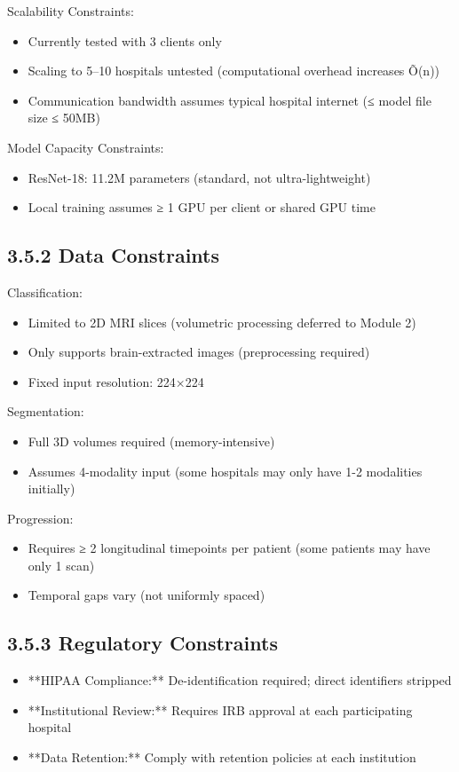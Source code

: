 Scalability Constraints:

\begin{itemize}
  \item Currently tested with 3 clients only
  \item Scaling to 5–10 hospitals untested (computational overhead increases \~O(n))
  \item Communication bandwidth assumes typical hospital internet (≤ model file size ≤ 50MB)
\end{itemize}

Model Capacity Constraints:

\begin{itemize}
  \item ResNet-18: 11.2M parameters (standard, not ultra-lightweight)
  \item Local training assumes ≥ 1 GPU per client or shared GPU time
\end{itemize}


\subsection{3.5.2 Data Constraints}
Classification:

\begin{itemize}
  \item Limited to 2D MRI slices (volumetric processing deferred to Module 2)
  \item Only supports brain-extracted images (preprocessing required)
  \item Fixed input resolution: 224×224
\end{itemize}

Segmentation:

\begin{itemize}
  \item Full 3D volumes required (memory-intensive)
  \item Assumes 4-modality input (some hospitals may only have 1-2 modalities initially)
\end{itemize}

Progression:

\begin{itemize}
  \item Requires ≥ 2 longitudinal timepoints per patient (some patients may have only 1 scan)
  \item Temporal gaps vary (not uniformly spaced)
\end{itemize}


\subsection{3.5.3 Regulatory Constraints}
\begin{itemize}
  \item **HIPAA Compliance:** De-identification required; direct identifiers stripped
  \item **Institutional Review:** Requires IRB approval at each participating hospital
  \item **Data Retention:** Comply with retention policies at each institution
\end{itemize}


